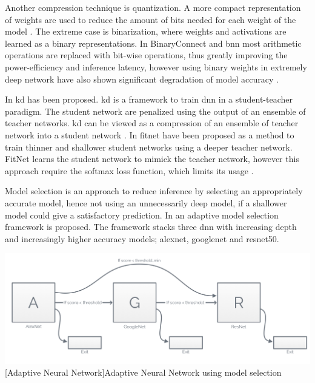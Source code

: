 \begin{enumdescript}
	Another compression technique is quantization. A more compact representation of weights are used to reduce the amount of bits needed for each weight of the model \cite{cheng_survey_2017}. The extreme case is binarization, where weights and activations are learned as a binary representations. In BinaryConnect \cite{courbariaux_binaryconnect:_2015} and \gls{bnn} \cite{courbariaux_binarized_2016} most arithmetic operations are replaced with bit-wise operations, thus greatly improving the power-efficiency and inference latency, however using binary weights in extremely deep network have also shown significant degradation of model accuracy \cite{cheng_survey_2017}.
	
	In \cite{hinton_distilling_2015} \gls{kd} has been proposed. \gls{kd} is a framework to train \gls{dnn} in a student-teacher paradigm. The student network are penalized using the output of an ensemble of teacher networks. \gls{kd} can be viewed as a compression of an ensemble of teacher network into a student network \cite{cheng_survey_2017}. 
	In \cite{romero_fitnets:_2014} \gls{fitnet} have been proposed as a method to train thinner and shallower student networks using a deeper teacher network. FitNet learns the student network to mimick the teacher network, however this approach require the softmax loss function, which limits its usage \cite{cheng_survey_2017}.  
	
	\item[Model Selection] Model selection is an approach to reduce inference by selecting an appropriately accurate model, hence not using an unnecessarily deep model, if a shallower model could give a satisfactory prediction. In \cite{bolukbasi_adaptive_2017} an adaptive model selection framework is proposed. The framework stacks three \gls{dnn} with increasing depth and increasingly higher accuracy models; \gls{alexnet}, \gls{googlenet} and \gls{resnet}50. 

	\begin{minipage}[t]{\linewidth}
		\centering                           
		\includegraphics[width=.8\linewidth]{figures/models/adaptive}
		[Adaptive Neural Network]{Adaptive Neural Network using model selection}
	\end{minipage}
	

\end{enumdescript}
